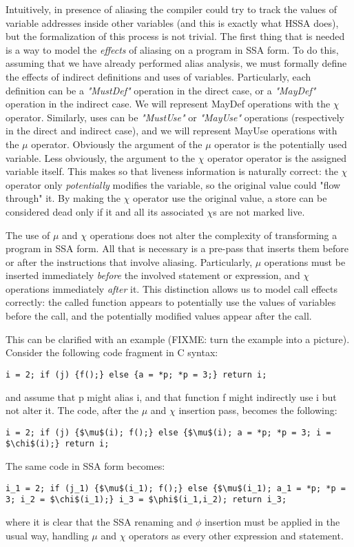 Intuitively, in presence of aliasing the compiler could try to track the values of variable addresses inside other variables (and this is exactly what HSSA does), but the formalization of this process is not trivial.
The first thing that is needed is a way to model the {\em effects} of aliasing on a program in SSA form.
To do this, assuming that we have already performed alias analysis, we must formally define the effects of indirect definitions and uses of variables.
Particularly, each definition can be a {\em "MustDef"} operation in the direct case, or a {\em "MayDef"} operation in the indirect case. We will represent MayDef operations with the $\chi$ operator.
Similarly, uses can be {\em "MustUse"} or {\em "MayUse"} operations (respectively in the direct and indirect case), and we will represent MayUse operations with the $\mu$ operator.
Obviously the argument of the $\mu$ operator is the potentially used variable.
Less obviously, the argument to the $\chi$ operator operator is the assigned variable itself. This makes so that liveness information is naturally correct: the $\chi$ operator only {\em potentially} modifies the variable, so the original value could "flow through" it. By making the $\chi$ operator use the original value, a store can be considered dead only if it and all its associated $\chi$s are not marked live.

The use of $\mu$ and $\chi$ operations does not alter the complexity of transforming a program in SSA form. All that is necessary is a pre-pass that inserts them before or after the instructions that involve aliasing. Particularly, $\mu$ operations must be inserted immediately {\em before} the involved statement or expression, and $\chi$ operations immediately {\em after} it. This distinction allows us to model call effects correctly: the called function appears to potentially use the values of variables before the call, and the potentially modified values appear after the call.

This can be clarified with an example (FIXME: turn the example into a picture).
Consider the following code fragment in C syntax:
\begin{verbatim}
i = 2; if (j) {f();} else {a = *p; *p = 3;} return i;
\end{verbatim}
and assume that p might alias i, and that function f might indirectly use i but not alter it.
The code, after the $\mu$ and $\chi$ insertion pass, becomes the following:
\begin{verbatim}
i = 2; if (j) {$\mu$(i); f();} else {$\mu$(i); a = *p; *p = 3; i = $\chi$(i);} return i;
\end{verbatim}
The same code in SSA form becomes:
\begin{verbatim}
i_1 = 2; if (j_1) {$\mu$(i_1); f();} else {$\mu$(i_1); a_1 = *p; *p = 3; i_2 = $\chi$(i_1);} i_3 = $\phi$(i_1,i_2); return i_3;
\end{verbatim}
where it is clear that the SSA renaming and $\phi$ insertion must be applied in the usual way, handling $\mu$ and $\chi$ operators as every other expression and statement.


